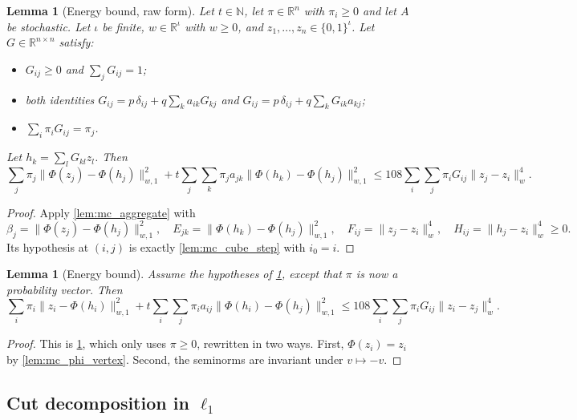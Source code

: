 \documentclass[11pt]{article}
\newtheorem{lemma}[theorem]{Lemma}
\theoremstyle{definition}
\theoremstyle{remark}
\newcommand{\R}{\mathbb{R}}
\newcommand{\N}{\mathbb{N}}
\newcommand{\wn}[1]{\lVert #1\rVert_{w,1}}
\newcommand{\hn}[1]{\lVert #1\rVert_{w}}
\begin{document}
\begin{lemma}[Energy bound, raw form]\label{lem:mc_cube_energy_raw}
Let $t\in\N$, let $\pi\in\R^n$ with $\pi_i\ge0$ and let $A$ be stochastic. Let $\iota$ be finite, $w\in\R^\iota$ with $w\ge0$, and $z_1,\dots,z_n\in\{0,1\}^\iota$. Let $G\in\R^{n\times n}$ satisfy:
\begin{itemize}
\item $G_{ij}\ge0$ and $\sum_jG_{ij}=1$;
\item both identities $G_{ij}=p\,\delta_{ij}+q\sum_ka_{ik}G_{kj}$ and $G_{ij}=p\,\delta_{ij}+q\sum_kG_{ik}a_{kj}$;
\item $\sum_i\pi_iG_{ij}=\pi_j$.
\end{itemize}
Let $h_k=\sum_lG_{kl}z_l$. Then
\[
\sum_j\pi_j\wn{\Phi(z_j)-\Phi(h_j)}^2+t\sum_j\sum_k\pi_ja_{jk}\wn{\Phi(h_k)-\Phi(h_j)}^2
\le108\sum_i\sum_j\pi_iG_{ij}\hn{z_j-z_i}^4 .
\]
\end{lemma}
\begin{proof}
Apply \cref{lem:mc_aggregate} with
\[
\beta_j=\wn{\Phi(z_j)-\Phi(h_j)}^2,\quad E_{jk}=\wn{\Phi(h_k)-\Phi(h_j)}^2,\quad F_{ij}=\hn{z_j-z_i}^4,\quad H_{ij}=\hn{h_j-z_i}^4\ge0 .
\]
Its hypothesis at $(i,j)$ is exactly \cref{lem:mc_cube_step} with $i_0=i$.
\end{proof}

\begin{lemma}[Energy bound]\label{lem:mc_cube_energy}
Assume the hypotheses of \cref{lem:mc_cube_energy_raw}, except that $\pi$ is now a probability vector. Then
\[
\sum_i\pi_i\wn{z_i-\Phi(h_i)}^2+t\sum_i\sum_j\pi_ia_{ij}\wn{\Phi(h_i)-\Phi(h_j)}^2
\le108\sum_i\sum_j\pi_iG_{ij}\hn{z_i-z_j}^4 .
\]
\end{lemma}
\begin{proof}
This is \cref{lem:mc_cube_energy_raw}, which only uses $\pi\ge0$, rewritten in two ways. First, $\Phi(z_i)=z_i$ by \cref{lem:mc_phi_vertex}. Second, the seminorms are invariant under $v\mapsto-v$.
\end{proof}

\subsection{Cut decomposition in $\ell_1$}
\end{document}
